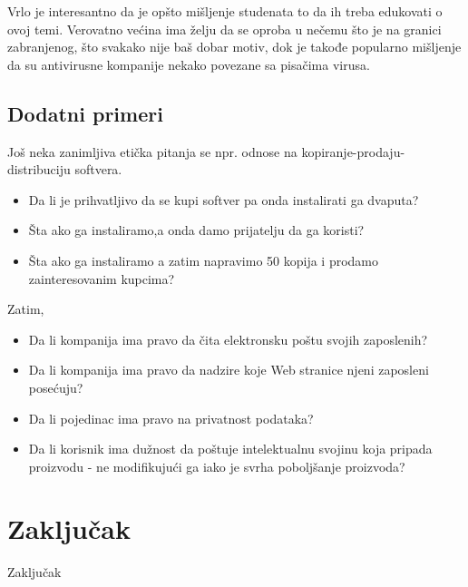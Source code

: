 \documentclass[a4paper]{article}
\begin{document}
Vrlo je interesantno da je opšto mišljenje studenata to da ih treba edukovati o ovoj temi. Verovatno većina ima želju da se oproba u nečemu što je na granici zabranjenog, što svakako nije baš dobar motiv,
dok je takođe popularno mišljenje da su antivirusne kompanije nekako povezane sa pisačima virusa.

\subsection{Dodatni primeri}
Još neka zanimljiva etička pitanja se npr. odnose na kopiranje-prodaju-distribuciju softvera.
\begin{itemize}
\item Da li je prihvatljivo da se kupi softver pa onda instalirati ga dvaputa?
\item Šta ako ga instaliramo,a onda damo prijatelju da ga koristi?
\item Šta ako ga instaliramo a zatim napravimo 50 kopija i prodamo zainteresovanim kupcima?
\end{itemize}
Zatim,
\begin{itemize} 
\item Da li kompanija ima pravo da čita elektronsku poštu svojih zaposlenih?
\item Da li kompanija ima pravo da nadzire koje Web stranice njeni zaposleni posećuju?
\item Da li pojedinac ima pravo na privatnost podataka?
\item Da li korisnik ima dužnost da poštuje intelektualnu svojinu koja pripada proizvodu - ne modifikujući ga iako je svrha poboljšanje proizvoda?
\end{itemize}

\section{Zaključak}
\label{sec:zakljucak}

Zaključak

\appendix
 


\appendix
\end{document}
